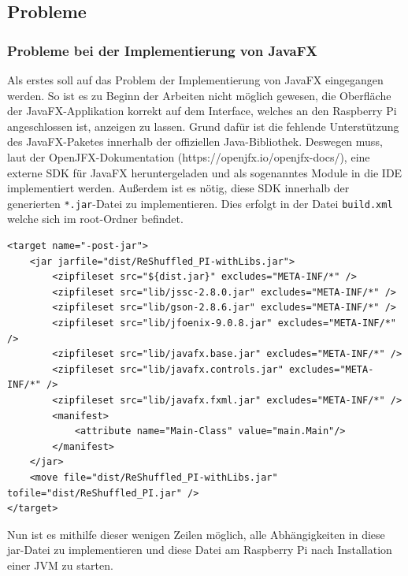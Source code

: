 \subsection{Probleme}
\subsubsection{Probleme bei der Implementierung von JavaFX}
Als erstes soll auf das Problem der Implementierung von JavaFX eingegangen  werden.
So ist es zu Beginn der Arbeiten nicht möglich gewesen, die Oberfläche der JavaFX-Applikation korrekt auf dem Interface, welches an den Raspberry Pi angeschlossen ist, anzeigen zu lassen.
Grund dafür ist die fehlende Unterstützung des JavaFX-Paketes innerhalb der offiziellen Java-Bibliothek.
Deswegen muss, laut der OpenJFX-Dokumentation (https://openjfx.io/openjfx-docs/), eine externe SDK für JavaFX heruntergeladen und als sogenanntes Module in die IDE implementiert werden.
Außerdem ist es nötig, diese SDK innerhalb der generierten \lstinline[style=C]{*.jar}-Datei zu implementieren.
Dies erfolgt in der Datei \lstinline[style=C]{build.xml} welche sich im root-Ordner befindet.
\begin{lstlisting}[style=xml,caption=Teilabschnitt build.xml,label=build]
<target name="-post-jar">
    <jar jarfile="dist/ReShuffled_PI-withLibs.jar">
        <zipfileset src="${dist.jar}" excludes="META-INF/*" />
        <zipfileset src="lib/jssc-2.8.0.jar" excludes="META-INF/*" />
        <zipfileset src="lib/gson-2.8.6.jar" excludes="META-INF/*" />
        <zipfileset src="lib/jfoenix-9.0.8.jar" excludes="META-INF/*" />
        <zipfileset src="lib/javafx.base.jar" excludes="META-INF/*" />
        <zipfileset src="lib/javafx.controls.jar" excludes="META-INF/*" />
        <zipfileset src="lib/javafx.fxml.jar" excludes="META-INF/*" />
        <manifest>
            <attribute name="Main-Class" value="main.Main"/>
        </manifest>
    </jar>
    <move file="dist/ReShuffled_PI-withLibs.jar" tofile="dist/ReShuffled_PI.jar" />
</target>
\end{lstlisting}
Nun ist es mithilfe dieser wenigen Zeilen möglich, alle Abhängigkeiten in diese jar-Datei zu implementieren und diese Datei am Raspberry Pi nach Installation einer \acs{JVM} zu starten.
